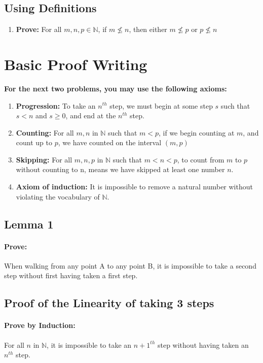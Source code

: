 \documentclass[12pt]{article}
\begin{document}
		\subsection{Using Definitions}
		\begin{enumerate}[resume]
			\item \textbf{Prove: } For all $ m,n,p\in\mathbb{N}$, if $m\nleq n$, then either $m\nleq p$ or $p \nleq n$
		\end{enumerate}
		\newpage
	\section{Basic Proof Writing}
		\textbf{For the next two problems, you may use the following axioms:}
		\begin{enumerate}
			\item \textbf{Progression: } To take an $n^{th}$ step, we must begin at some step $s$ such that $s<n$ and $s\geq 0$, and end at the $n^{th}$ step.
			\item \textbf{Counting: }For all $m,n$ in $\mathbb{N}$ such that $m<p$, if we begin counting at $m$, and count up to $p$, we have counted on the interval $(m,p)$
			\item\textbf{Skipping: } For all $m,n,p$ in $\mathbb{N}$ such that $m<n<p$, to count from $m$ to $p$ without counting to n, means we have skipped at least one number $n$.
			\item\textbf{Axiom of induction: } It is impossible to remove a natural number without violating the vocabulary of $\mathbb{N}$.
		\end{enumerate}
		\subsection{Lemma 1}
		\paragraph{Prove:} When walking from any point A to any point B, it is impossible to take a second step without first having taken a first step.
		\subsection{Proof of the Linearity of taking 3 steps}
		\paragraph{Prove by Induction:} For all $ n$ in $\mathbb{N}$, it is impossible to take an $n+1^{th}$ step without having taken an $n^{th}$ step.\newline
\end{document}
